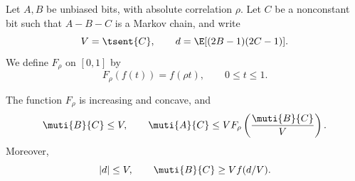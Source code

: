 Let $A,B$ be unbiased bits, with absolute correlation $\rho$.
Let $C$ be a nonconstant bit such that $A-B-C$ is a Markov chain,
and write
\begin{equation*}
  V=\tsent{C},\qquad
  d=\E[(2B-1)(2C-1)].
\end{equation*}
We define $F_\rho$ on $[0,1]$ by
\begin{equation*}
  F_\rho(f(t))=f(\rho t),\qquad 0\le t\le1.
\end{equation*}

\begin{lemma}
\label{lem:comparison-calculus}
The function $F_\rho$ is increasing and concave, and
\begin{equation*}
  \muti{B}{C}\le V,
  \qquad
  \muti{A}{C}\le V F_\rho\left(\frac{\muti{B}{C}}V\right).
\end{equation*}
Moreover,
\begin{equation*}
  |d|\le V,
  \qquad \muti{B}{C}\ge V f(d/V).
\end{equation*}
\end{lemma}
